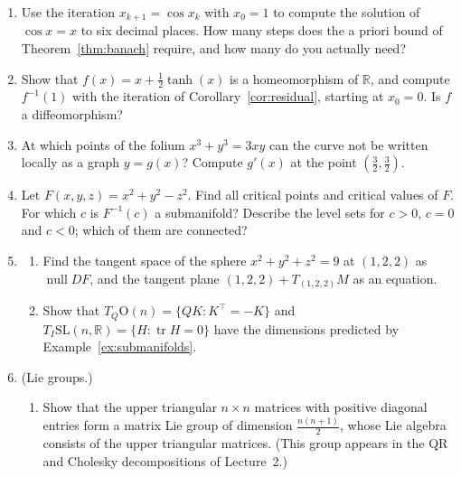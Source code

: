 \documentclass[11pt]{article}
\theoremstyle{definition}
\theoremstyle{plain}
\theoremstyle{remark}
\DeclareMathOperator{\Null}{null}
\DeclareMathOperator{\tr}{tr}
\begin{document}
\begin{enumerate}[leftmargin=*]
\begin{enumerate}[label=(\alph*)]
        \item Show that the unit circle $S^1$ is path-connected, and that the hyperbola $\{x^2 - y^2 = 1\}$ is not connected.
        \item Show that $\mathrm{SO}(2)$ is path-connected, and that $\mathrm{O}(2)$ is not connected.
        \item Show that no continuous injective map from $S^1$ to $\mathbb{R}$ exists. (Hint: intermediate value theorem.)
    \end{enumerate}
    \item Use the iteration $x_{k+1} = \cos x_k$ with $x_0 = 1$ to compute the solution of $\cos x = x$ to six decimal places. How many steps does the a priori bound of Theorem~\ref{thm:banach} require, and how many do you actually need?
    \item Show that $f(x) = x + \frac{1}{2}\tanh(x)$ is a homeomorphism of $\mathbb{R}$, and compute $f^{-1}(1)$ with the iteration of Corollary~\ref{cor:residual}, starting at $x_0 = 0$. Is $f$ a diffeomorphism?
    \item At which points of the folium $x^3 + y^3 = 3xy$ can the curve not be written locally as a graph $y = g(x)$? Compute $g'(x)$ at the point $(\frac{3}{2}, \frac{3}{2})$.
    \item Let $F(x, y, z) = x^2 + y^2 - z^2$. Find all critical points and critical values of $F$. For which $c$ is $F^{-1}(c)$ a submanifold? Describe the level sets for $c > 0$, $c = 0$ and $c < 0$; which of them are connected?
    \item \begin{enumerate}[label=(\alph*)]
        \item Find the tangent space of the sphere $x^2 + y^2 + z^2 = 9$ at $(1, 2, 2)$ as $\Null DF$, and the tangent plane $(1, 2, 2) + T_{(1, 2, 2)}M$ as an equation.
        \item Show that $T_Q \mathrm{O}(n) = \{QK : K^\top = -K\}$ and $T_I \mathrm{SL}(n, \mathbb{R}) = \{H : \tr H = 0\}$ have the dimensions predicted by Example~\ref{ex:submanifolds}.
    \end{enumerate}
    \item (Lie groups.)
    \begin{enumerate}[label=(\alph*)]
        \item Show that the upper triangular $n \times n$ matrices with positive diagonal entries form a matrix Lie group of dimension $\frac{n(n+1)}{2}$, whose Lie algebra consists of the upper triangular matrices. (This group appears in the QR and Cholesky decompositions of Lecture~2.)

\end{enumerate}
\end{enumerate}
\end{document}
